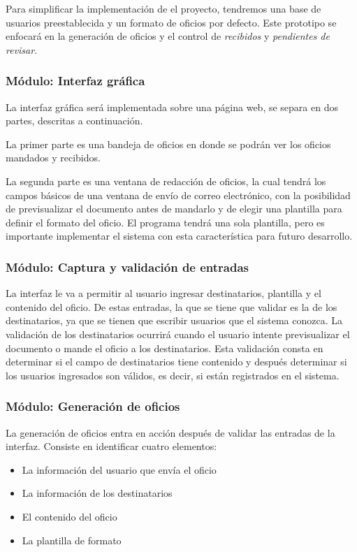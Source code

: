 \documentclass[letterpaper]{article}
\begin{document}
Para simplificar la implementación de el proyecto, tendremos una base de usuarios preestablecida y un formato de oficios por defecto. Este prototipo se enfocará en la generación de oficios y el control de \emph{recibidos} y \emph{pendientes de revisar}.

\subsubsection{Módulo: Interfaz gráfica}
La interfaz gráfica será implementada sobre una página web, se separa en dos partes, descritas a continuación.

La primer parte es una bandeja de oficios en donde se podrán ver los oficios mandados y recibidos.

La segunda parte es una ventana de redacción de oficios, la cual tendrá los campos básicos de una ventana de envío de correo electrónico, con la posibilidad de previsualizar el documento antes de mandarlo y de elegir una plantilla para definir el formato del oficio. El programa tendrá una sola plantilla, pero es importante implementar el sistema con esta característica para futuro desarrollo.

\subsubsection{Módulo: Captura y validación de entradas}
La interfaz le va a permitir al usuario ingresar destinatarios, plantilla y el contenido del oficio. De estas entradas, la que se tiene que validar es la de los destinatarios, ya que se tienen que escribir usuarios que el sistema conozca. La validación de los destinatarios ocurrirá cuando el usuario intente previsualizar el documento o mande el oficio a los destinatarios. Esta validación consta en determinar si el campo de destinatarios tiene contenido y después determinar si los usuarios ingresados son válidos, es decir, si están registrados en el sistema.

\subsubsection{Módulo: Generación de oficios}
La generación de oficios entra en acción después de validar las entradas de la interfaz. Consiste en identificar cuatro elementos:
\begin{itemize}
\item La información del usuario que envía el oficio
\item La información de los destinatarios
\item El contenido del oficio
\item La plantilla de formato
\end{itemize}
\end{document}
